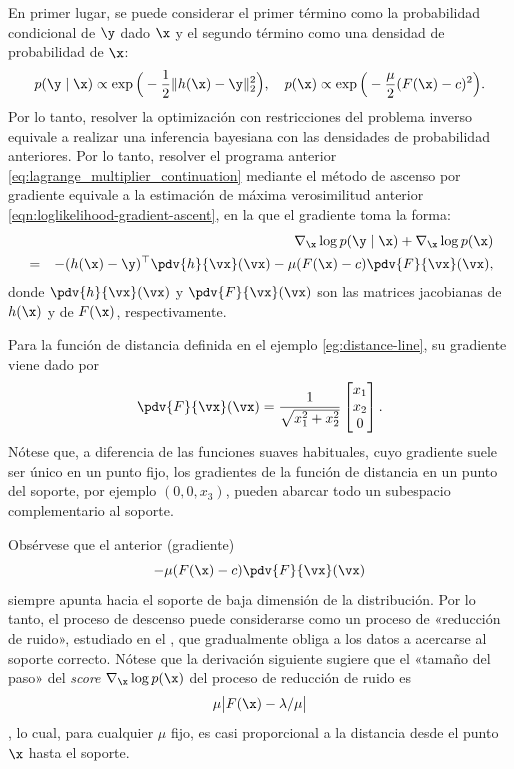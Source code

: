 \documentclass[../../book-main_es.tex]{subfiles}
\begin{document}
En primer lugar, se puede considerar el primer término como la probabilidad condicional
de $\y$ dado $\x$ y el segundo término como una densidad de probabilidad de $\x$:
\begin{equation}
    p(\y\mid \x) \propto \exp\Big(- \frac{1}{2}\|h(\x) - \y\|_2^2\Big), \quad
    p(\x) \propto \exp\Big( - \frac{\mu}{2}(F(\x) - c)^2\Big).
\end{equation}
Por lo tanto, resolver la optimización con restricciones del problema inverso
equivale a realizar una inferencia bayesiana con las densidades de probabilidad
anteriores. Por lo tanto, resolver el programa anterior
\eqref{eq:lagrange_multiplier_continuation} mediante el método de ascenso por gradiente
equivale a la estimación de máxima verosimilitud anterior
\eqref{eqn:loglikelihood-gradient-ascent},
en la que el gradiente toma la forma:
\begin{eqnarray}
    && \nabla_{\x} \log p(\y \mid \x) + \nabla_{\x} \log p(\x)  \\
    &=&  - (h(\x) - \y)^\top \pdv{h}{\vx}(\vx) -  \mu
    (F(\x) - c) \pdv{F}{\vx}(\vx), \label{eqn:EngMin-gradient}
\end{eqnarray}
donde $\pdv{h}{\vx}(\vx)$ y $\pdv{F}{\vx}(\vx)$ son las matrices jacobianas de
$h(\x)$ y de $F(\x)$, respectivamente.
\begin{example}[Gradiente de $F(\x)$] Para la función de distancia
    definida en el ejemplo \ref{eg:distance-line}, su gradiente viene dado por
    \begin{equation}
        \pdv{F}{\vx}(\vx) =  \frac{1}{\sqrt{x_1^2 + x_2^2}}\left[
            \begin{matrix}
                x_1 \\ x_2 \\ 0
        \end{matrix}\right].
    \end{equation}
    Nótese que, a diferencia de las funciones suaves habituales, cuyo gradiente suele
    ser único en un punto fijo, los gradientes de la función de distancia
    en un punto del soporte, por ejemplo $(0, 0, x_3)$, pueden abarcar
    todo un subespacio complementario al soporte.
\end{example}

Obsérvese que el anterior (gradiente)
$$-  \mu (F(\x) - c) \pdv{F}{\vx}(\vx)$$ siempre apunta
hacia el soporte de baja dimensión de la distribución. Por lo tanto, el
proceso de descenso puede considerarse como un proceso de «reducción de ruido», estudiado en el
, que gradualmente obliga a los datos a acercarse
al soporte correcto. Nótese que la derivación siguiente
sugiere que el «tamaño del paso» del \textit{score} $\nabla_{\x}
\log p(\x)$ del proceso de reducción de ruido es 
$$\mu \big| F(\x) - \lambda/\mu\big|$$, 
lo cual, para cualquier $\mu$ fijo, es casi proporcional
a la distancia desde el punto $\x$ hasta el soporte.
\end{document}
